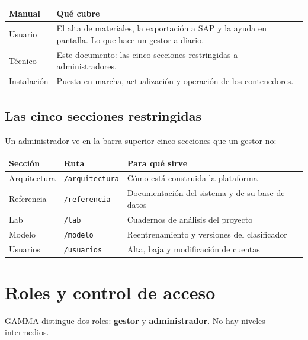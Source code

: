 \begin{center}
\begin{tabular}{@{}lp{9.2cm}@{}}
\toprule
\textbf{Manual} & \textbf{Qué cubre} \\
\midrule
Usuario      & El alta de materiales, la exportación a SAP y la ayuda en pantalla. Lo que hace un gestor a diario. \\
Técnico      & Este documento: las cinco secciones restringidas a administradores. \\
Instalación  & Puesta en marcha, actualización y operación de los contenedores. \\
\bottomrule
\end{tabular}
\end{center}

\subsection{Las cinco secciones restringidas}

Un administrador ve en la barra superior cinco secciones que un gestor no:

\begin{center}
\begin{tabular}{@{}llp{7.4cm}@{}}
\toprule
\textbf{Sección} & \textbf{Ruta} & \textbf{Para qué sirve} \\
\midrule
Arquitectura & \texttt{/arquitectura} & Cómo está construida la plataforma \\
Referencia   & \texttt{/referencia}   & Documentación del sistema y de su base de datos \\
Lab          & \texttt{/lab}          & Cuadernos de análisis del proyecto \\
Modelo       & \texttt{/modelo}       & Reentrenamiento y versiones del clasificador \\
Usuarios     & \texttt{/usuarios}     & Alta, baja y modificación de cuentas \\
\bottomrule
\end{tabular}
\end{center}

\newpage
\section{Roles y control de acceso}

GAMMA distingue dos roles: \textbf{gestor} y \textbf{administrador}. No hay
niveles intermedios.

